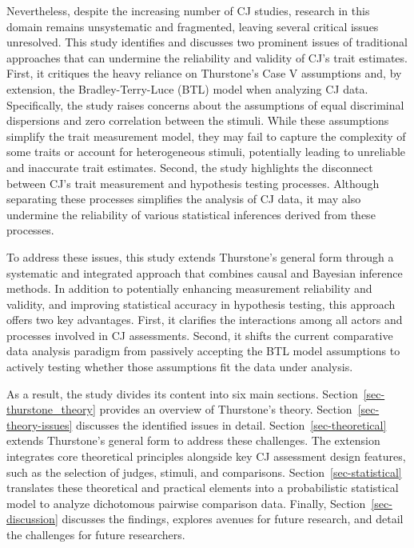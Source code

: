 \documentclass[
  authoryear,
  review,
  1p]{elsarticle}
\begin{document}
Nevertheless, despite the increasing number of CJ studies, research in
this domain remains unsystematic and fragmented, leaving several
critical issues unresolved. This study identifies and discusses two
prominent issues of traditional approaches that can undermine the
reliability and validity of CJ's trait estimates. First, it critiques
the heavy reliance on Thurstone's Case V assumptions
\citep{Thurstone_1927b} and, by extension, the Bradley-Terry-Luce (BTL)
model \citep{Bradley_et_al_1952, Luce_1959} when analyzing CJ data.
Specifically, the study raises concerns about the assumptions of equal
discriminal dispersions and zero correlation between the stimuli. While
these assumptions simplify the trait measurement model, they may fail to
capture the complexity of some traits or account for heterogeneous
stimuli, potentially leading to unreliable and inaccurate trait
estimates. Second, the study highlights the disconnect between CJ's
trait measurement and hypothesis testing processes. Although separating
these processes simplifies the analysis of CJ data, it may also
undermine the reliability of various statistical inferences derived from
these processes.

To address these issues, this study extends Thurstone's general form
through a systematic and integrated approach that combines causal and
Bayesian inference methods. In addition to potentially enhancing
measurement reliability and validity, and improving statistical accuracy
in hypothesis testing, this approach offers two key advantages. First,
it clarifies the interactions among all actors and processes involved in
CJ assessments. Second, it shifts the current comparative data analysis
paradigm from passively accepting the BTL model assumptions to actively
testing whether those assumptions fit the data under analysis.

As a result, the study divides its content into six main sections.
Section~\ref{sec-thurstone_theory} provides an overview of Thurstone's
theory. Section~\ref{sec-theory-issues} discusses the identified issues
in detail. Section~\ref{sec-theoretical} extends Thurstone's general
form to address these challenges. The extension integrates core
theoretical principles alongside key CJ assessment design features, such
as the selection of judges, stimuli, and comparisons.
Section~\ref{sec-statistical} translates these theoretical and practical
elements into a probabilistic statistical model to analyze dichotomous
pairwise comparison data. Finally, Section~\ref{sec-discussion}
discusses the findings, explores avenues for future research, and detail
the challenges for future researchers.
\end{document}

